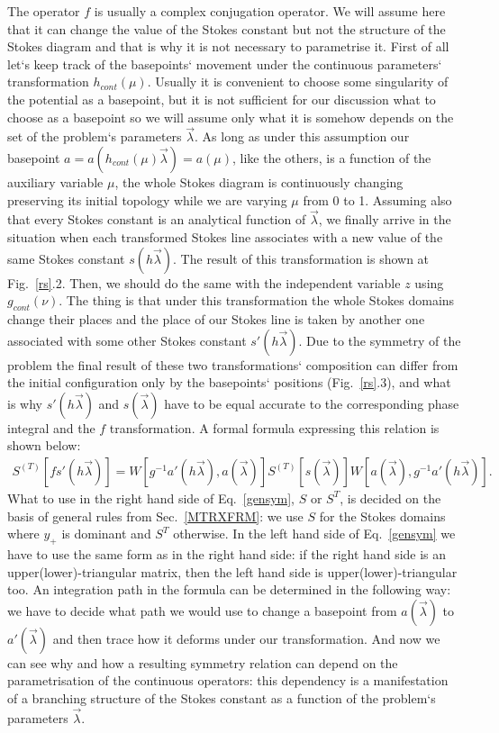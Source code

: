 \documentclass[aps,prl,preprint,superscriptaddress]{revtex4}
\begin{document}
The operator $f$ is usually a complex conjugation operator. We will assume here that it can change the value of the Stokes constant but not the structure of the Stokes diagram and that is why it is not necessary to parametrise it. First of all let`s keep track of the basepoints` movement under the continuous parameters` transformation $h_{cont}(\mu)$. Usually it is convenient to choose some singularity of the potential as a basepoint, but it is not sufficient for our discussion what to choose as a basepoint so we will assume only what it is somehow depends on the set of the problem`s parameters $\vec{\lambda}$. As long as under this assumption our basepoint $a=a(h_{cont}(\mu)\vec{\lambda})=a(\mu)$, like the others, is a function of the auxiliary variable $\mu$, the whole Stokes diagram is continuously changing preserving its initial topology while we are varying $\mu$ from 0 to 1. Assuming also that every Stokes constant is an analytical function of $\vec{\lambda}$, we finally arrive in the situation when each transformed Stokes line associates with a new value of the same Stokes constant $s(h\vec{\lambda})$. The result of this transformation is shown at Fig.~\ref{rs}.2. Then, we should do the same with the independent variable $z$ using $g_{cont}(\nu)$. The thing is that under this transformation the whole Stokes domains change their places and the place of our Stokes line is taken by another one associated with some other Stokes constant $s'(h\vec{\lambda})$. Due to the symmetry of the problem the final result of these two transformations` composition can differ from the initial configuration only by the basepoints` positions (Fig.~\ref{rs}.3), and what is why $s'(h\vec{\lambda})$ and $s(\vec{\lambda})$ have to be equal accurate to the corresponding phase integral and the $f$ transformation. A formal formula expressing this relation is shown below:
\begin{eqnarray}
S^{(T)}[f s'(h\vec{\lambda})] = 
W[g^{-1}a'(h\vec{\lambda}),a(\vec{\lambda})]S^{(T)}[s(\vec{\lambda})]W[a(\vec{\lambda}),g^{-1}a'(h\vec{\lambda})].
\label{gensym}
\end{eqnarray}
What to use in the right hand side of Eq.~\ref{gensym}, $S$ or $S^T$, is decided on the basis of general rules from Sec.~\ref{MTRXFRM}: we use $S$ for the Stokes domains where $y_+$ is dominant and $S^T$ otherwise. In the left hand side of Eq.~\ref{gensym} we have to use the same form as in the right hand side: if the right hand side is an upper(lower)-triangular matrix, then the left hand side is upper(lower)-triangular too. An integration path in the formula can be determined in the following way: we have to decide what path we would use to change a basepoint from $a(\vec{\lambda})$ to $a'(\vec{\lambda})$ and then trace how it deforms under our transformation. And now we can see why and how a resulting symmetry relation can depend on the parametrisation of the continuous operators: this dependency is a manifestation of a branching structure of the Stokes constant as a function of the problem`s parameters $\vec{\lambda}$.
\end{document}
